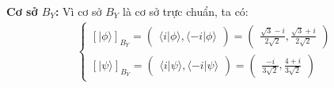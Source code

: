 \textbf{Cơ sở $B_{Y}$:} Vì cơ sở $B_{Y}$ là cơ sở trực chuẩn, ta có:
\begin{align*}
    \begin{cases}
        [|\phi\rangle]_{B_{Y}} = \begin{pmatrix}
                                     \langle i|\phi\rangle,
                                     \langle -i|\phi\rangle
                                 \end{pmatrix} = \begin{pmatrix}
                                                     \frac{\sqrt{3} - i}{2\sqrt{2}},
                                                     \frac{\sqrt{3} + i}{2\sqrt{2}}
                                                 \end{pmatrix} \\
        [|\psi\rangle]_{B_{Y}} = \begin{pmatrix}
                                     \langle i|\psi\rangle,
                                     \langle -i|\psi\rangle
                                 \end{pmatrix} = \begin{pmatrix}
                                                     \frac{-i}{3\sqrt{2}},
                                                     \frac{4 + i}{3\sqrt{2}}
                                                 \end{pmatrix}
    \end{cases}
\end{align*}


